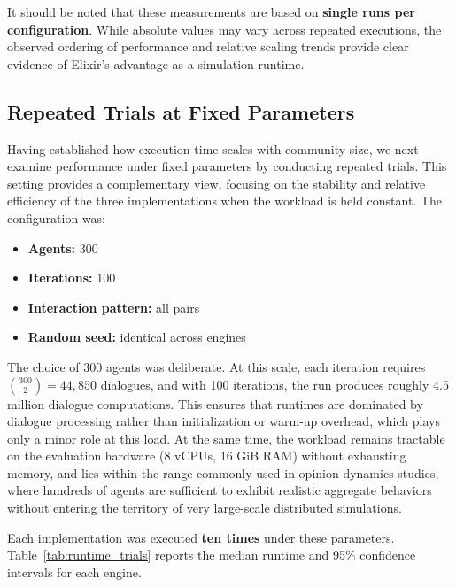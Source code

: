 \documentclass[
]{ceurart}
\begin{document}
It should be noted that these measurements are based on \textbf{single runs per configuration}. While absolute values may vary across repeated executions, the observed ordering of performance and relative scaling trends provide clear evidence of Elixir’s advantage as a simulation runtime.


\subsection{Repeated Trials at Fixed Parameters}
Having established how execution time scales with community size, we next examine performance under fixed parameters by conducting repeated trials. This setting provides a complementary view, focusing on the stability and relative efficiency of the three implementations when the workload is held constant. The configuration was:

\begin{itemize}
	\item \textbf{Agents:} 300
	\item \textbf{Iterations:} 100
	\item \textbf{Interaction pattern:} all pairs
	\item \textbf{Random seed:} identical across engines
\end{itemize}

The choice of 300 agents was deliberate. At this scale, each iteration requires $\binom{300}{2} = 44{,}850$ dialogues, and with 100 iterations, the run produces roughly 4.5 million dialogue computations. This ensures that runtimes are dominated by dialogue processing rather than initialization or warm-up overhead, which plays only a minor role at this load. At the same time, the workload remains tractable on the evaluation hardware (8 vCPUs, 16 GiB RAM) without exhausting memory, and lies within the range commonly used in opinion dynamics studies, where hundreds of agents are sufficient to exhibit realistic aggregate behaviors without entering the territory of very large-scale distributed simulations.


Each implementation was executed \textbf{ten times} under these parameters. Table~\ref{tab:runtime_trials} reports the median runtime and 95\% confidence intervals for each engine.
\end{document}
